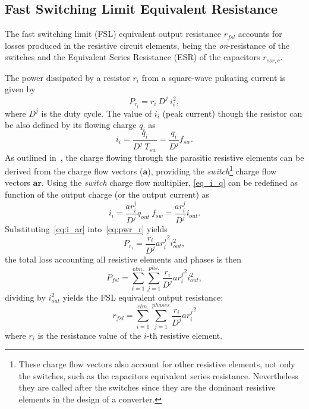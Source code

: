 \subsection[FSL Equivalent Resistance]{Fast Switching Limit Equivalent Resistance}
The fast switching limit (FSL) equivalent output resistance $r_{fsl}$ accounts for losses produced in the resistive circuit elements, being the \emph{on}-resistance of the switches and the Equivalent Series Resistance (ESR) of the capacitors $r_{esr,c}$.

The power dissipated by a resistor $r_i$ from a square-wave pulsating current is given by
\begin{equation}
P_{r_i} = r_i~D^j~i_i^2,
\label{eq:pwr_r}
\end{equation}
where $D^j$ is the duty cycle. The value of $i_i$ (peak current) though the resistor can be also defined by its flowing charge $q_i$ as
\begin{equation}
i_i = \frac{q_i}{D^j~T_{sw}} = \frac{q_i}{D^j} f_{sw}.
\label{eq:i_q}
\end{equation}
As outlined in~\cite{Seeman:EECS-2009-78}, the charge flowing through the parasitic resistive elements can be derived from the charge flow vectors ($\mathbf{a}$), providing the \emph{switch}\footnote{These charge flow vectors also account for other resistive elements, not only the switches, such as the capacitors equivalent series resistance. Nevertheless they are called after the switches since they are the dominant resistive elements in the design of a converter.} charge flow vectors $\mathbf{ar}$. Using the \emph{switch} charge flow multiplier, \eqref{eq_i_q} can be redefined as function of the output charge (or the output current) as
\begin{equation}
i_i = \frac{ar_i^j}{D^j} q_{out}~f_{sw} = \frac{ar_i^j}{D^j} i_{out}.
\label{eq:i_ar}
\end{equation}
Substituting~\eqref{eq:i_ar} into~\eqref{eq:pwr_r} yields
\begin{equation}
P_{r_i} = \frac{r_i}{D^j}{ar_i^j}^2 i_{out}^2 ,
\label{eq:pwr_r_ar}
\end{equation}
the total loss accounting all resistive elements and phases is then
\begin{equation}
P_{fsl} = \sum_{i=1}^{elm.} \sum_{j=1}^{phs.}  \frac{r_i}{D^j}{ar_i^j}^2 i_{out}^2,
\label{eq:pwr_fsl}
\end{equation}
dividing by $i_{out}^2$ yields the FSL equivalent output resistance:
\begin{equation}
r_{fsl}=\sum_{i=1}^{elm.}\sum_{j=1}^{phases}\frac{r_i}{D^j}{ar_i^j}^2
\label{eq:r_fsl}
\end{equation}
where $r_i$ is the resistance value of the $i$-th resistive element.


